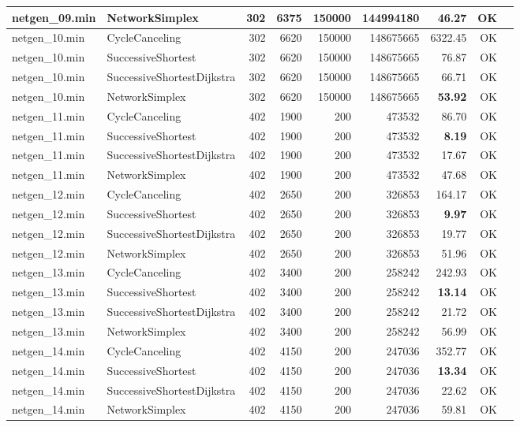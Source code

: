 \begin{longtable}{llrrrrrrl}
netgen\_09.min & NetworkSimplex & 302 & 6375 & 150000 & 144994180 & \textbf{46.27} & OK \\
\midrule
netgen\_10.min & CycleCanceling & 302 & 6620 & 150000 & 148675665 & 6322.45 & OK \\
netgen\_10.min & SuccessiveShortest & 302 & 6620 & 150000 & 148675665 & 76.87 & OK \\
netgen\_10.min & SuccessiveShortestDijkstra & 302 & 6620 & 150000 & 148675665 & 66.71 & OK \\
netgen\_10.min & NetworkSimplex & 302 & 6620 & 150000 & 148675665 & \textbf{53.92} & OK \\
\midrule
netgen\_11.min & CycleCanceling & 402 & 1900 & 200 & 473532 & 86.70 & OK \\
netgen\_11.min & SuccessiveShortest & 402 & 1900 & 200 & 473532 & \textbf{8.19} & OK \\
netgen\_11.min & SuccessiveShortestDijkstra & 402 & 1900 & 200 & 473532 & 17.67 & OK \\
netgen\_11.min & NetworkSimplex & 402 & 1900 & 200 & 473532 & 47.68 & OK \\
\midrule
netgen\_12.min & CycleCanceling & 402 & 2650 & 200 & 326853 & 164.17 & OK \\
netgen\_12.min & SuccessiveShortest & 402 & 2650 & 200 & 326853 & \textbf{9.97} & OK \\
netgen\_12.min & SuccessiveShortestDijkstra & 402 & 2650 & 200 & 326853 & 19.77 & OK \\
netgen\_12.min & NetworkSimplex & 402 & 2650 & 200 & 326853 & 51.96 & OK \\
\midrule
netgen\_13.min & CycleCanceling & 402 & 3400 & 200 & 258242 & 242.93 & OK \\
netgen\_13.min & SuccessiveShortest & 402 & 3400 & 200 & 258242 & \textbf{13.14} & OK \\
netgen\_13.min & SuccessiveShortestDijkstra & 402 & 3400 & 200 & 258242 & 21.72 & OK \\
netgen\_13.min & NetworkSimplex & 402 & 3400 & 200 & 258242 & 56.99 & OK \\
\midrule
netgen\_14.min & CycleCanceling & 402 & 4150 & 200 & 247036 & 352.77 & OK \\
netgen\_14.min & SuccessiveShortest & 402 & 4150 & 200 & 247036 & \textbf{13.34} & OK \\
netgen\_14.min & SuccessiveShortestDijkstra & 402 & 4150 & 200 & 247036 & 22.62 & OK \\
netgen\_14.min & NetworkSimplex & 402 & 4150 & 200 & 247036 & 59.81 & OK \\

\end{longtable}
